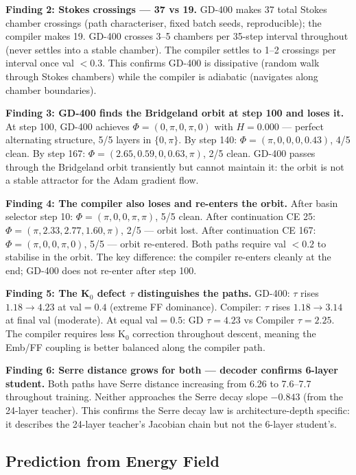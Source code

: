 \documentclass[11pt]{amsart}
\begin{document}
\textbf{Finding 2: Stokes crossings --- 37 vs 19.}
GD-400 makes 37 total Stokes chamber crossings (path characteriser,
fixed batch seeds, reproducible);
the compiler makes 19.
GD-400 crosses 3--5 chambers per 35-step interval throughout
(never settles into a stable chamber).
The compiler settles to 1--2 crossings per interval once val $< 0.3$.
This confirms GD-400 is dissipative (random walk through Stokes chambers)
while the compiler is adiabatic (navigates along chamber boundaries).

\textbf{Finding 3: GD-400 finds the Bridgeland orbit at step 100 and loses it.}
At step 100, GD-400 achieves $\Phi = (0,\pi,0,\pi,0)$ with $H = 0.000$
--- perfect alternating structure, 5/5 layers in $\{0,\pi\}$.
By step 140: $\Phi = (\pi,0,0,0,0.43)$, 4/5 clean.
By step 167: $\Phi = (2.65,0.59,0,0.63,\pi)$, 2/5 clean.
GD-400 passes through the Bridgeland orbit transiently
but cannot maintain it: the orbit is not a stable attractor for the
Adam gradient flow.

\textbf{Finding 4: The compiler also loses and re-enters the orbit.}
After basin selector step 10: $\Phi = (\pi,0,0,\pi,\pi)$, 5/5 clean.
After continuation CE 25: $\Phi = (\pi,2.33,2.77,1.60,\pi)$, 2/5 --- orbit lost.
After continuation CE 167: $\Phi = (\pi,0,0,\pi,0)$, 5/5 --- orbit re-entered.
Both paths require val $< 0.2$ to stabilise in the orbit.
The key difference: the compiler re-enters cleanly at the end;
GD-400 does not re-enter after step 100.

\textbf{Finding 5: The K$_0$ defect $\tau$ distinguishes the paths.}
GD-400: $\tau$ rises $1.18 \to 4.23$ at val$=0.4$ (extreme FF dominance).
Compiler: $\tau$ rises $1.18 \to 3.14$ at final val (moderate).
At equal val$=0.5$: GD $\tau=4.23$ vs Compiler $\tau=2.25$.
The compiler requires less K$_0$ correction throughout descent,
meaning the Emb/FF coupling is better balanced along the compiler path.

\textbf{Finding 6: Serre distance grows for both --- decoder confirms 6-layer student.}
Both paths have Serre distance increasing from 6.26 to 7.6--7.7 throughout training.
Neither approaches the Serre decay slope $-0.843$ (from the 24-layer teacher).
This confirms the Serre decay law is architecture-depth specific:
it describes the 24-layer teacher's Jacobian chain but not the 6-layer student's.

\subsection{Prediction from Energy Field}
\end{document}
